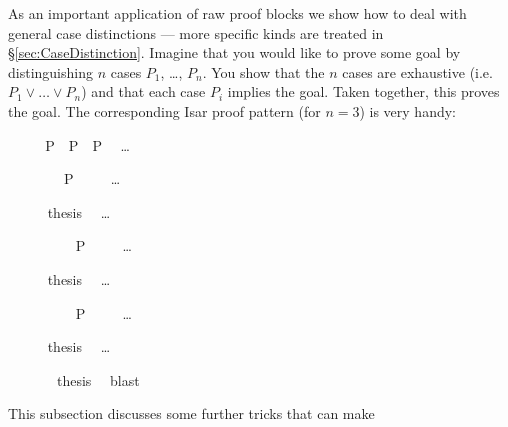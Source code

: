 \begin{isabellebody}
\begin{isamarkuptext}
As an important application of raw proof blocks we show how to deal
with general case distinctions --- more specific kinds are treated in
\S\ref{sec:CaseDistinction}. Imagine that you would like to prove some
goal by distinguishing $n$ cases $P_1$, \dots, $P_n$. You show that
the $n$ cases are exhaustive (i.e.\ $P_1 \lor \dots \lor P_n$) and
that each case $P_i$ implies the goal. Taken together, this proves the
goal. The corresponding Isar proof pattern (for $n = 3$) is very handy:%
\end{isamarkuptext}%
\isamarkuptrue%
%
\renewcommand{\isamarkupcmt}[1]{#1}
%
\isadelimproof
%
\endisadelimproof
%
\isatagproof
{}\isamarkupfalse%
\ {\isacharminus}\isanewline
\ \ \isamarkupfalse%
\ {\isachardoublequoteopen}P\ {\isasymor}\ P\ {\isasymor}\ P\ \ %
\isamarkupcmt{\dots%
}
\isanewline
\ \ \isamarkupfalse%
\isanewline
\ \ \isacommand{{\isacharbraceleft}}\isamarkupfalse%
\ \isamarkupfalse%
\ P\isanewline
\ \ \ \ %
\isamarkupcmt{\dots%
}
\isanewline
\ \ \ \ \isamarkupfalse%
\ {\isacharquery}thesis\ \ %
\isamarkupcmt{\dots%
}
\ \isacommand{{\isacharbraceright}}\isamarkupfalse%
\isanewline
\ \ \isamarkupfalse%
\isanewline
\ \ \isacommand{{\isacharbraceleft}}\isamarkupfalse%
\ \isamarkupfalse%
\ P\isanewline
\ \ \ \ %
\isamarkupcmt{\dots%
}
\isanewline
\ \ \ \ \isamarkupfalse%
\ {\isacharquery}thesis\ \ %
\isamarkupcmt{\dots%
}
\ \isacommand{{\isacharbraceright}}\isamarkupfalse%
\isanewline
\ \ \isamarkupfalse%
\isanewline
\ \ \isacommand{{\isacharbraceleft}}\isamarkupfalse%
\ \isamarkupfalse%
\ P\isanewline
\ \ \ \ %
\isamarkupcmt{\dots%
}
\isanewline
\ \ \ \ \isamarkupfalse%
\ {\isacharquery}thesis\ \ %
\isamarkupcmt{\dots%
}
\ \isacommand{{\isacharbraceright}}\isamarkupfalse%
\isanewline
\ \ \isamarkupfalse%
\ \isamarkupfalse%
\ {\isacharquery}thesis\ \isamarkupfalse%
\ blast\isanewline
{}\isamarkupfalse%
%
\endisatagproof
{\isafoldproof}%
%
\isadelimproof
%
\endisadelimproof
%
\renewcommand{\isamarkupcmt}[1]{{\isastylecmt--- #1}}
%
\isamarkuptrue%
%
\begin{isamarkuptext}%
This subsection discusses some further tricks that can make

\end{isamarkuptext}
\end{isabellebody}
